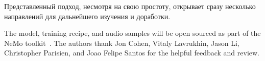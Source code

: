 Представленный подход, несмотря на свою простоту, открывает сразу несколько направлений для дальнейшего изучения и доработки.

The model, training recipe, and audio samples will be open sourced as part of the NeMo toolkit~\cite{nemo}. The authors thank Jon Cohen, Vitaly Lavrukhin, Jason Li, Christopher Parisien, and Joao Felipe Santos for the helpful feedback and review.